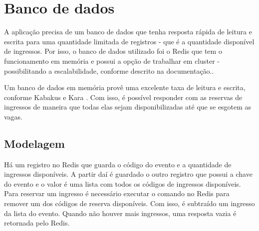 \section{Banco de dados}\label{banco-de-dados}

A aplicação precisa de um banco de dados que tenha resposta rápida de leitura e
escrita para uma quantidade limitada de registros - que é a quantidade disponível
de ingressos. Por isso, o banco de dados utilizado foi o Redis que tem o funcionamento
em memória e possui a opção de trabalhar em cluster - possibilitando a escalabilidade,
conforme descrito na documentação.\cite{redis-cluster-specification}.


Um banco de dados em memória provê uma excelente taxa de leitura e escrita, conforme
Kabakus e Kara \cite{a-performance-evaluation-of-in-memory-databases}.
Com isso, é possível responder com as reservas de ingressos de maneira que todas elas
sejam disponibilizadas até que se esgotem as vagas.

\subsection{Modelagem}

Há um registro no Redis que guarda o código do evento e a quantidade de ingressos
disponíveis. A partir daí é guardado o outro registro que possui a chave do evento
e o valor é uma lista com todos os códigos de ingressos disponíveis. Para reservar
um ingresso é necessário executar o comando no Redis para remover um dos códigos
de reserva disponíveis. Com isso, é subtraído um ingresso da lista do evento. Quando
não houver mais ingressos, uma resposta vazia é retornada pelo Redis.
